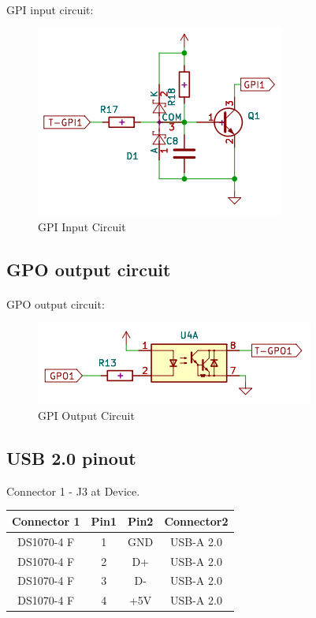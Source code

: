 \documentclass{article}
\begin{document}
		\paragraph{}GPI input circuit:
			\begin{figure}[!h] %
				\centering
				\includegraphics[keepaspectratio]{imgs/GPI_input.png}
				\caption{GPI Input Circuit}
				\label{fig:gpi-input}
			\end{figure}

	\subsection{GPO output circuit}\label{gpo-output-circuit}
		\paragraph{}GPO output circuit:
			\begin{figure}[!h] %
				\centering
				\includegraphics[keepaspectratio]{imgs/GPI_output.png}
				\caption{GPI Output Circuit}
				\label{fig:gpo-output}
			\end{figure}
	
	\subsection{USB 2.0 pinout}\label{usb-2.0-pinout}
		Connector 1 - J3 at Device.
		\begin{center}
			\begin{tabular}{|c|c|c|c|}
				\hline
				Connector 1 & Pin1 & Pin2 & Connector2 \\
				\hline
				DS1070-4 F & 1 & GND & USB-A 2.0 \\
				DS1070-4 F & 2 & D+ & USB-A 2.0 \\
				DS1070-4 F & 3 & D- & USB-A 2.0 \\
				DS1070-4 F & 4 & +5V & USB-A 2.0 \\
				\hline
			\end{tabular}
		\end{center}
	
\end{document}
